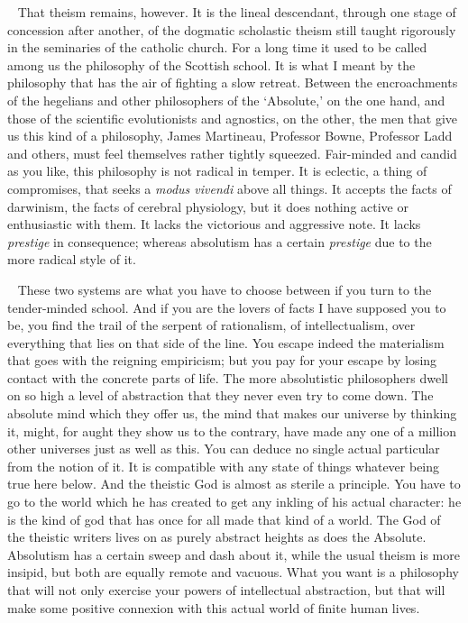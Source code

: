 \documentclass[12pt]{article}
\newcounter{wjparagraph}[section]
\newcommand*{\wjparagraph}{\stepcounter{wjparagraph}~\marginpar{\tiny\arabic{wjparagraph} }}
\begin{document}
\wjparagraph
That theism remains, however. It is the lineal descendant, through one stage of concession after another, of the dogmatic scholastic theism still taught rigorously in the seminaries of the catholic church. For a long time it used to be called among us the philosophy of the Scottish school. It is what I meant by the philosophy that has the air of fighting a slow retreat. Between the encroachments of the hegelians and other philosophers of the `Absolute,' on the one hand, and those of the scientific evolutionists and agnostics, on the other, the men that give us this kind of a philosophy, James Martineau, Professor Bowne, Professor Ladd and others, must feel themselves rather tightly squeezed. Fair-minded and candid as you like, this philosophy is not radical in temper. It is eclectic, a thing of compromises, that seeks a \emph{modus vivendi} above all things. It accepts the facts of darwinism, the facts of cerebral physiology, but it does nothing active or enthusiastic with them. It lacks the victorious and aggressive note. It lacks \emph{prestige} in consequence; whereas absolutism has a certain \emph{prestige} due to the more radical style of it.

\wjparagraph
These two systems are what you have to choose between if you turn to the tender-minded school. And if you are the lovers of facts I have supposed you to be, you find the trail of the serpent of rationalism, of intellectualism, over everything that lies on that side of the line. You escape indeed the materialism that goes with the reigning empiricism; but you pay for your escape by losing contact with the concrete parts of life. The more absolutistic philosophers dwell on so high a level of abstraction that they never even try to come down. The absolute mind which they offer us, the mind that makes our universe by thinking it, might, for aught they show us to the contrary, have made any one of a million other universes just as well as this. You can deduce no single actual particular from the notion of it. It is compatible with any state of things whatever being true here below. And the theistic God is almost as sterile a principle. You have to go to the world which he has created to get any inkling of his actual character: he is the kind of god that has once for all made that kind of a world. The God of the theistic writers lives on as purely abstract heights as does the Absolute. Absolutism has a certain sweep and dash about it, while the usual theism is more insipid, but both are equally remote and vacuous. What you want is a philosophy that will not only exercise your powers of intellectual abstraction, but that will make some positive connexion with this actual world of finite human lives.
\end{document}
